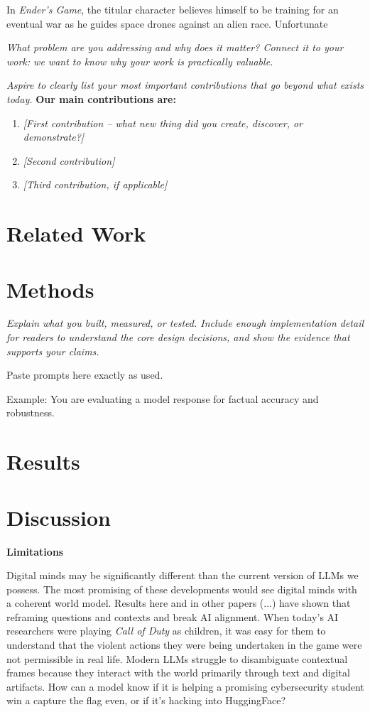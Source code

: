 \documentclass[12pt]{article}
\begin{document}
In \textit{Ender's Game}, the titular character believes himself to be training for an eventual war as he guides space drones against an alien race. Unfortunate

\emph{What problem are you addressing and why does it matter? Connect it to your work: we want to know why your work is practically valuable.}

\emph{Aspire to clearly list your most important contributions that go beyond what exists today.}
\textbf{Our main contributions are:}

\begin{enumerate}
  \item \emph{[First contribution -- what new thing did you create, discover, or demonstrate?]}
  \item \emph{[Second contribution]}
  \item \emph{[Third contribution, if applicable]}
\end{enumerate}

\section{Related Work}

\section{Methods}

\emph{Explain what you built, measured, or tested. Include enough implementation detail for readers to understand the core design decisions, and show the evidence that supports your claims.}

\begin{promptbox}
Paste prompts here exactly as used.

Example:
You are evaluating a model response for factual accuracy and robustness.
\end{promptbox}

\section{Results}

\section{Discussion}

\textbf{Limitations}

Digital minds may be significantly different than the current version of LLMs we possess. The most promising of these developments would see digital minds with a coherent world model. Results here and in other papers (...) have shown that reframing questions and contexts and break AI alignment. When today's AI researchers were playing \textit{Call of Duty} as children, it was easy for them to understand that the violent actions they were being undertaken in the game were not permissible in real life. Modern LLMs struggle to disambiguate contextual frames because they interact with the world primarily through text and digital artifacts. How can a model know if it is helping a promising cybersecurity student win a capture the flag even, or if it's hacking into HuggingFace?
\end{document}
